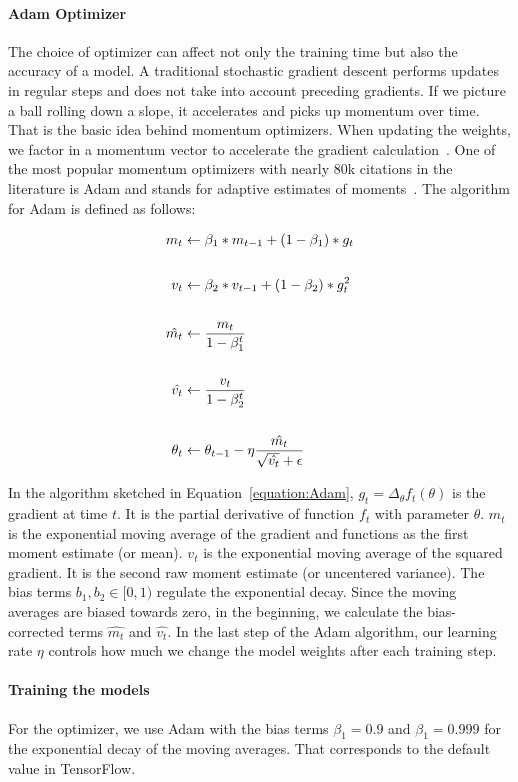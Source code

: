 \paragraph{Adam Optimizer}
The choice of optimizer can affect not only the training time but also the accuracy of a model. A traditional stochastic gradient descent performs updates in regular steps and does not take into account preceding gradients. If we picture a ball rolling down a slope, it accelerates and picks up momentum over time. That is the basic idea behind momentum optimizers. When updating the weights, we factor in a momentum vector to accelerate the gradient calculation~\cite{geron2019hands}. One of the most popular momentum optimizers with nearly 80k citations in the literature is Adam and stands for adaptive estimates of moments~\cite{kingma2014adam}. The algorithm for Adam is defined as follows:

\begin{equation}
\setlength{\jot}{19pt}
    \begin{aligned}
        m_t&\leftarrow \beta_1*m_{t-1}+(1-\beta_1)*g_t  \\
        v_t&\leftarrow\beta_2*v_{t-1}+(1-\beta_2)*g_t^2 \\
        \hat{m_t}&\leftarrow\frac{m_t}{1-\beta_1^t} \\
        \hat{v_t}&\leftarrow\frac{v_t}{1-\beta_2^t} \\
        \theta_t&\leftarrow\theta_{t-1}-\eta\frac{\hat{m_t}}{\sqrt{\hat{v_t}}+\epsilon} 
    \end{aligned}
    \label{equation:Adam}
\end{equation}

In the algorithm sketched in Equation~\ref{equation:Adam}, $g_t=\Delta_{\theta}f_t(\theta)$ is the gradient at time $t$. It is the partial derivative of function $f_t$ with parameter $\theta$. $m_t$ is the exponential moving average of the gradient and functions as the first moment estimate (or mean). $v_t$ is the exponential moving average of the squared gradient. It is the second raw moment estimate (or uncentered variance). The bias terms $b_1,b_2\in [0,1)$ regulate the exponential decay. Since the moving averages are biased towards zero, in the beginning, we calculate the bias-corrected terms $\hat{m_t}$ and $\hat{v_t}$. In the last step of the Adam algorithm, our learning rate $\eta$ controls how much we change the model weights after each training step.

\paragraph{Training the models}
For the optimizer, we use Adam with the bias terms $\beta_1=0.9$ and $\beta_1=0.999$ for the exponential decay of the moving averages. That corresponds to the default value in TensorFlow. 

